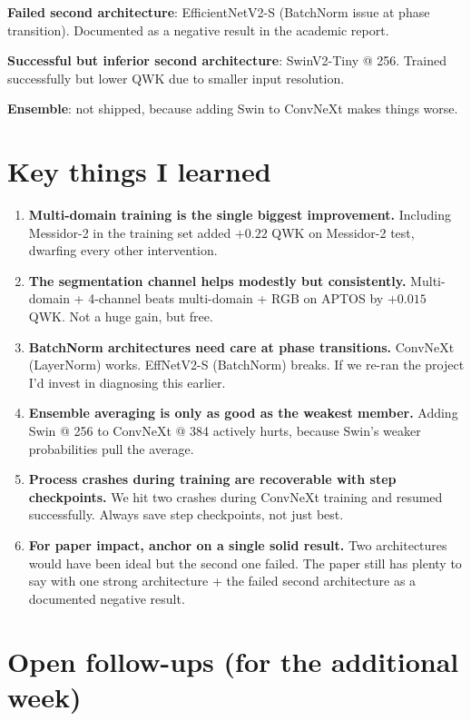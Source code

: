 \documentclass[11pt,a4paper]{article}
\begin{document}
\textbf{Failed second architecture}: EfficientNetV2-S (BatchNorm issue at phase transition). Documented as a negative result in the academic report.

\textbf{Successful but inferior second architecture}: SwinV2-Tiny @ 256. Trained successfully but lower QWK due to smaller input resolution.

\textbf{Ensemble}: not shipped, because adding Swin to ConvNeXt makes things worse.

\section{Key things I learned}

\begin{enumerate}
  \item \textbf{Multi-domain training is the single biggest improvement.} Including Messidor-2 in the training set added $+0.22$ QWK on Messidor-2 test, dwarfing every other intervention.

  \item \textbf{The segmentation channel helps modestly but consistently.} Multi-domain + 4-channel beats multi-domain + RGB on APTOS by $+0.015$ QWK. Not a huge gain, but free.

  \item \textbf{BatchNorm architectures need care at phase transitions.} ConvNeXt (LayerNorm) works. EffNetV2-S (BatchNorm) breaks. If we re-ran the project I'd invest in diagnosing this earlier.

  \item \textbf{Ensemble averaging is only as good as the weakest member.} Adding Swin @ 256 to ConvNeXt @ 384 actively hurts, because Swin's weaker probabilities pull the average.

  \item \textbf{Process crashes during training are recoverable with step checkpoints.} We hit two crashes during ConvNeXt training and resumed successfully. Always save step checkpoints, not just best.

  \item \textbf{For paper impact, anchor on a single solid result.} Two architectures would have been ideal but the second one failed. The paper still has plenty to say with one strong architecture + the failed second architecture as a documented negative result.
\end{enumerate}

\section{Open follow-ups (for the additional week)}
\end{document}
